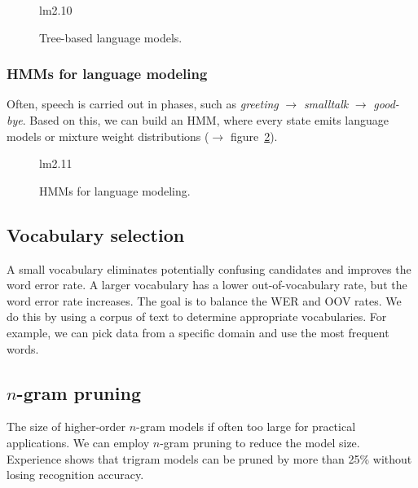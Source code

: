 \documentclass[11pt]{article}
\begin{document}
\begin{figure}[htb]
    \begin{minipage}{\linewidth}
        \vspace{4cm}
        \hfill \scriptsize lm2.10
    \end{minipage}
    \caption{\label{fig:treeBasedLM} Tree-based language models.}
\end{figure}

\subsubsection{HMMs for language modeling}

Often, speech is carried out in phases, such as \textit{greeting} $\rightarrow$ \textit{smalltalk} $\rightarrow$ \textit{good-bye}. Based on this, we can build an HMM, where every state emits language models or mixture weight distributions ($\to$ figure~\ref{fig:hmmLM}).

\begin{figure}[htb]
    \begin{minipage}{\linewidth}
        \vspace{3cm}
        \hfill \scriptsize lm2.11
    \end{minipage}
    \caption{\label{fig:hmmLM} HMMs for language modeling.}
\end{figure}

\subsection{Vocabulary selection}
A small vocabulary eliminates potentially confusing candidates and improves the word error rate. A larger vocabulary has a lower out-of-vocabulary rate, but the word error rate increases. The goal is to balance the WER and OOV rates. We do this by using a corpus of text to determine appropriate vocabularies. For example, we can pick data from a specific domain and use the most frequent words.

\subsection{$n$-gram pruning}
The size of higher-order $n$-gram models if often too large for practical applications. We can employ $n$-gram pruning to reduce the model size. Experience shows that trigram models can be pruned by more than 25\% without losing recognition accuracy.
\end{document}
